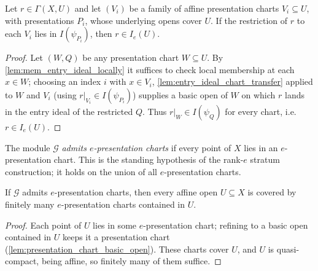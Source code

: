 \begin{lemma}
  \label{lem:mem_strata_ideal_of_charts}
  \leanok
  Let \(r \in \Gamma(X, U)\) and let \((V_i)\) be a family of affine
  presentation charts \(V_i \subseteq U\), with presentations \(P_i\), whose
  underlying opens cover \(U\).  If the restriction of \(r\) to each \(V_i\)
  lies in \(I(\psi_{P_i})\), then \(r \in I_e(U)\).
\end{lemma}

\begin{proof}
  \leanok
  Let \((W, Q)\) be any presentation chart \(W \subseteq U\).  By
  \cref{lem:mem_entry_ideal_locally} it suffices to check local membership at
  each \(x \in W\); choosing an index \(i\) with \(x \in V_i\),
  \cref{lem:entry_ideal_chart_transfer} applied to \(W\) and \(V_i\) (using
  \(r|_{V_i} \in I(\psi_{P_i})\)) supplies a basic open of \(W\) on which
  \(r\) lands in the entry ideal of the restricted \(Q\).  Thus
  \(r|_W \in I(\psi_Q)\) for every chart, i.e.\ \(r \in I_e(U)\).
\end{proof}

\begin{definition}
  \label{def:charts_cover}
  \leanok
  The module \(\mathcal G\) \emph{admits \(e\)-presentation charts} if every
  point of \(X\) lies in an \(e\)-presentation chart.  This is the standing
  hypothesis of the rank-\(e\) stratum construction; it holds on the union of
  all \(e\)-presentation charts.
\end{definition}

\begin{lemma}
  \label{lem:charts_cover_finite}
  \leanok
  If \(\mathcal G\) admits \(e\)-presentation charts, then every affine open
  \(U \subseteq X\) is covered by finitely many \(e\)-presentation charts
  contained in \(U\).
\end{lemma}

\begin{proof}
  \leanok
  Each point of \(U\) lies in some \(e\)-presentation chart; refining to a
  basic open contained in \(U\) keeps it a presentation chart
  (\cref{lem:presentation_chart_basic_open}).  These charts cover \(U\), and
  \(U\) is quasi-compact, being affine, so finitely many of them suffice.
\end{proof}

